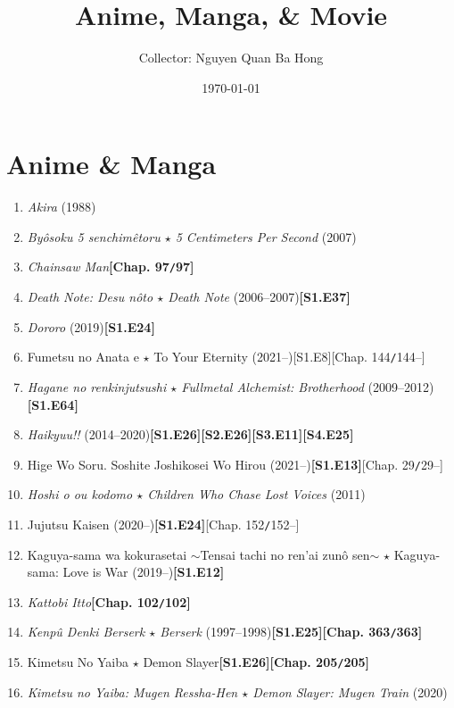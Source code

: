 \documentclass{article}
\title{Anime, Manga, {\large\&} Movie}
\author{Collector: Nguyen Quan Ba Hong}
\date{\today}
\numberwithin{equation}{section}
\begin{document}
\maketitle
\tableofcontents


\section{Anime \& Manga}
\begin{enumerate}
    \item \textit{Akira} (1988)
    \item \textit{Byôsoku 5 senchimêtoru $\star$ 5 Centimeters Per Second} (2007)
    \item \textit{Chainsaw Man}\hfill\textbf{[Chap. 97\texttt{/}97]}
    \item \textit{Death Note: Desu nôto $\star$ Death Note} (2006--2007)\hfill\textbf{[S1.E37]}
    \item \textit{Dororo} (2019)\hfill\textbf{[S1.E24]}
    \item Fumetsu no Anata e $\star$ To Your Eternity (2021--)\hfill[S1.E8][Chap. 144\texttt{/}144--]
    \item \textit{Hagane no renkinjutsushi $\star$ Fullmetal Alchemist: Brotherhood} (2009--2012)\hfill\textbf{[S1.E64]}
    \item \textit{Haikyuu!!} (2014--2020)\hfill\textbf{[S1.E26][S2.E26][S3.E11][S4.E25]}
    \item Hige Wo Soru. Soshite Joshikosei Wo Hirou (2021--)\hfill\textbf{[S1.E13]}[Chap. 29\texttt{/}29--]
    \item \textit{Hoshi o ou kodomo $\star$ Children Who Chase Lost Voices} (2011)
    \item Jujutsu Kaisen (2020--)\hfill\textbf{[S1.E24]}[Chap. 152\texttt{/}152--]
    \item Kaguya-sama wa kokurasetai $\sim$Tensai tachi no ren'ai zun\^o sen$\sim$ $\star$ Kaguya-sama: Love is War (2019--)\hfill\textbf{[S1.E12]}
    \item \textit{Kattobi Itto}\hfill\textbf{[Chap. 102\texttt{/}102]}
    \item \textit{Kenp\^u Denki Berserk $\star$ Berserk} (1997--1998)\hfill\textbf{[S1.E25]}\textbf{[Chap. 363\texttt{/}363]}
    \item Kimetsu No Yaiba $\star$ Demon Slayer\hfill\textbf{[S1.E26]}\textbf{[Chap. 205\texttt{/}205]}
    \item \textit{Kimetsu no Yaiba: Mugen Ressha-Hen $\star$ Demon Slayer: Mugen Train} (2020)

\end{enumerate}
\end{document}
